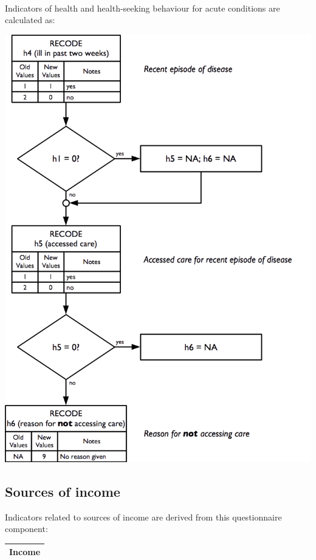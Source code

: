 \documentclass[12pt,a4paper]{book}
\theoremstyle{definition}
\theoremstyle{definition}
\theoremstyle{definition}
\theoremstyle{remark}
\begin{document}
~

Indicators of health and health-seeking behaviour for acute conditions
are calculated as:

\begin{center}\includegraphics{figures/indicators22} \end{center}

\hypertarget{sources-of-income}{%
\subsection{Sources of income}\label{sources-of-income}}

Indicators related to sources of income are derived from this
questionnaire component:

\begin{longtable}[]{@{}c@{}}
\toprule
\begin{minipage}[t]{0.97\columnwidth}\centering
\textbf{Income}\strut
\end{minipage}\tabularnewline
\bottomrule
\end{longtable}
\end{document}
